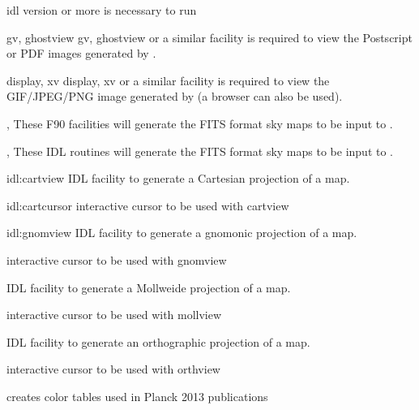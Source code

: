 \renewcommand{\projfullname}{{a Mollweide}}
\begin{codedescription}
{}
\end{codedescription}


%

\newpage
\begin{related}
  \begin{sulist}{} %
  \item[idl] version \idlversion or more is necessary to run \thedocid
  \item[gv, ghostview] gv, ghostview or a similar facility is required to view
	  the Postscript or PDF images generated by \thedocid.
  \item[display, xv] display, xv or a similar facility is required to view the
            GIF/JPEG/PNG image generated by \thedocid{} (a browser can also 
            be used).
  \item[\htmlref{synfast}{fac:synfast}, \htmlref{smoothing}{fac:smoothing}] These F90 \healpix facilities will generate the FITS format 
            sky maps to be input to \thedocid.
  \item[\htmlref{isynfast}{idl:isynfast}, \htmlref{ismoothing}{idl:ismoothing}] These IDL routines will generate the FITS format 
            sky maps to be input to \thedocid.
  \item[{\htmlref{cartview} {idl:cartview}}] 
	IDL facility to generate a Cartesian projection of
  	a \healpix map.
  \item[{\htmlref{cartcursor} {idl:cartcursor}}] 
	interactive cursor to be used with cartview
  \item[{\htmlref{gnomview} {idl:gnomview}}] 
	IDL facility to generate a gnomonic projection of
  	a \healpix map.
  \item[{\htmlref{gnomcursor}{idl:gnomcursor}}] 
	interactive cursor to be used with gnomview
  \item[{\htmlref{mollview}{idl:mollview}}] 
	IDL facility to generate a Mollweide projection of
  	a \healpix map.
  \item[{\htmlref{mollcursor}{idl:mollcursor}}] interactive cursor to be used with mollview
  \item[{\htmlref{orthview}{idl:orthview}}] 
	IDL facility to generate an orthographic projection of
  	a \healpix map.
  \item[{\htmlref{orthcursor}{idl:orthcursor}}] 
	interactive cursor to be used with orthview
  \item[{\htmlref{planck\_colors}{idl:planck_colors}}]
        creates color tables used in Planck 2013 publications
  \end{sulist}
\end{related}



